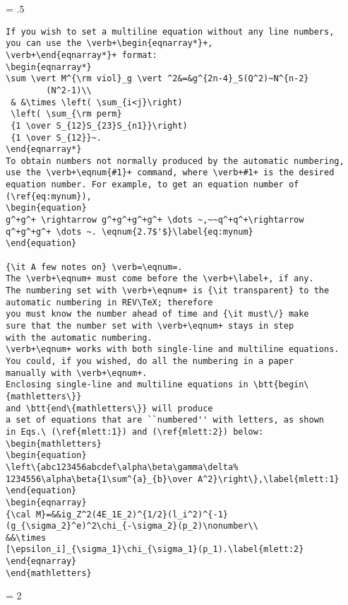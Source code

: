 \newpage
\baselineskip = .5\baselineskip  %
\begin{verbatim}
If you wish to set a multiline equation without any line numbers,
you can use the \verb+\begin{eqnarray*}+,
\verb+\end{eqnarray*}+ format:
\begin{eqnarray*}
\sum \vert M^{\rm viol}_g \vert ^2&=&g^{2n-4}_S(Q^2)~N^{n-2}
        (N^2-1)\\
 & &\times \left( \sum_{i<j}\right)
 \left( \sum_{\rm perm}
 {1 \over S_{12}S_{23}S_{n1}}\right)
 {1 \over S_{12}}~.
\end{eqnarray*}
To obtain numbers not normally produced by the automatic numbering,
use the \verb+\eqnum{#1}+ command, where \verb+#1+ is the desired
equation number. For example, to get an equation number of
(\ref{eq:mynum}),
\begin{equation}
g^+g^+ \rightarrow g^+g^+g^+g^+ \dots ~,~~q^+q^+\rightarrow
q^+g^+g^+ \dots ~. \eqnum{2.7$'$}\label{eq:mynum}
\end{equation}

{\it A few notes on} \verb=\eqnum=.
The \verb+\eqnum+ must come before the \verb+\label+, if any.
The numbering set with \verb+\eqnum+ is {\it transparent} to the
automatic numbering in REV\TeX; therefore
you must know the number ahead of time and {\it must\/} make
sure that the number set with \verb+\eqnum+ stays in step
with the automatic numbering.
\verb+\eqnum+ works with both single-line and multiline equations.
You could, if you wished, do all the numbering in a paper
manually with \verb+\eqnum+.
Enclosing single-line and multiline equations in \btt{begin\{mathletters\}}
and \btt{end\{mathletters\}} will produce
a set of equations that are ``numbered'' with letters, as shown
in Eqs.\ (\ref{mlett:1}) and (\ref{mlett:2}) below:
\begin{mathletters}
\begin{equation}
\left\{abc123456abcdef\alpha\beta\gamma\delta%
1234556\alpha\beta{1\sum^{a}_{b}\over A^2}\right\},\label{mlett:1}
\end{equation}
\begin{eqnarray}
{\cal M}=&&ig_Z^2(4E_1E_2)^{1/2}(l_i^2)^{-1}
(g_{\sigma_2}^e)^2\chi_{-\sigma_2}(p_2)\nonumber\\
&&\times
[\epsilon_i]_{\sigma_1}\chi_{\sigma_1}(p_1).\label{mlett:2}
\end{eqnarray}
\end{mathletters}
\end{verbatim} \newpage
\baselineskip = 2\baselineskip  %

